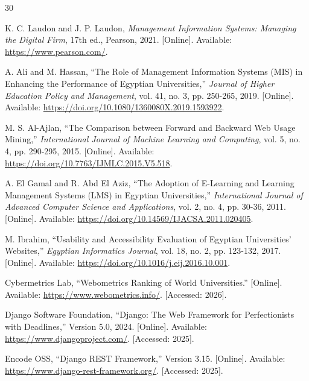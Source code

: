 \clearpage
\begingroup
\let\chapter\section
\renewcommand{\bibname}{References}
\renewcommand{\refname}{References}
\begin{thebibliography}{30}

K. C. Laudon and J. P. Laudon, \textit{Management Information Systems: Managing the Digital Firm}, 17th ed., Pearson, 2021. [Online]. Available: \url{https://www.pearson.com/}.

A. Ali and M. Hassan, ``The Role of Management Information Systems (MIS) in Enhancing the Performance of Egyptian Universities,'' \textit{Journal of Higher Education Policy and Management}, vol. 41, no. 3, pp. 250-265, 2019. [Online]. Available: \url{https://doi.org/10.1080/1360080X.2019.1593922}.

M. S. Al-Ajlan, ``The Comparison between Forward and Backward Web Usage Mining,'' \textit{International Journal of Machine Learning and Computing}, vol. 5, no. 4, pp. 290-295, 2015. [Online]. Available: \url{https://doi.org/10.7763/IJMLC.2015.V5.518}.

A. El Gamal and R. Abd El Aziz, ``The Adoption of E-Learning and Learning Management Systems (LMS) in Egyptian Universities,'' \textit{International Journal of Advanced Computer Science and Applications}, vol. 2, no. 4, pp. 30-36, 2011. [Online]. Available: \url{https://doi.org/10.14569/IJACSA.2011.020405}.

M. Ibrahim, ``Usability and Accessibility Evaluation of Egyptian Universities' Websites,'' \textit{Egyptian Informatics Journal}, vol. 18, no. 2, pp. 123-132, 2017. [Online]. Available: \url{https://doi.org/10.1016/j.eij.2016.10.001}.

Cybermetrics Lab, ``Webometrics Ranking of World Universities.'' [Online]. Available: \url{https://www.webometrics.info/}. [Accessed: 2026].

Django Software Foundation, ``Django: The Web Framework for Perfectionists with Deadlines,'' Version 5.0, 2024. [Online]. Available: \url{https://www.djangoproject.com/}. [Accessed: 2025].

Encode OSS, ``Django REST Framework,'' Version 3.15. [Online]. Available: \url{https://www.django-rest-framework.org/}. [Accessed: 2025].


\end{thebibliography}
